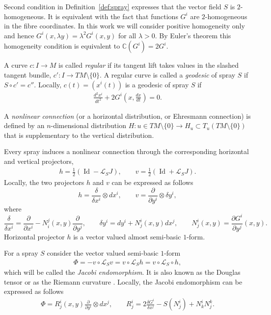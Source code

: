 \documentclass[11pt]{article}
\numberwithin{equation}{section}
\begin{document}
Second condition in Def\/inition~\ref{def:spray} expresses that the
vector f\/ield $S$ is $2$-homogeneous. It is equivalent with the
fact that functions $G^i$ are $2$-homogeneous in the f\/ibre
coordinates. In this work we will consider positive homogeneity
only and hence $G^i(x,\lambda y)=\lambda^2 G^i(x,y)$
for all $\lambda>0$. By Euler's theorem this homogeneity condition is equivalent to
$\mathbb{C}(G^i)=2G^i$.

A curve $c:I \to M$ is called \emph{regular} if its tangent lift takes
values in the slashed tangent bundle, $c': I \to
TM\setminus\{0\}$. A regular curve is called a \emph{geodesic} of
spray $S$ if $S\circ c'=c''$. Locally, $c(t)=(x^i(t))$ is a
geodesic of spray $S$ if
\begin{gather*}
\frac{d^2x^i}{dt^2}+2G^i\left(x,\frac{dx}{dt}\right)=0.
\end{gather*}

\begin{Definition} A \emph{nonlinear connection} (or a horizontal
distribution, or Ehresmann connection) is def\/ined by an
$n$-dimensional distribution $H: u\in TM\setminus\{0\} \to
H_u\subset T_u(TM\setminus\{0\})$ that is supplementary to the
vertical distribution. \end{Definition}

Every spray induces a nonlinear connection through the
corresponding horizontal and vertical projectors, \cite{grifone72}
\begin{gather*}
h=\frac{1}{2}\left(\operatorname{Id}-\mathcal{L}_SJ\right), \qquad
v=\frac{1}{2}\left(\operatorname{Id}+\mathcal{L}_SJ\right).
\end{gather*} Locally, the two projectors $h$ and $v$ can
be expressed as follows
\[
h=\frac{\delta}{\delta x^i} \otimes dx^i, \qquad
v=\frac{\partial}{\partial y^i}\otimes \delta y^i,
\] where
\[
\frac{\delta}{\delta x^i}=\frac{\partial}{\partial
x^i}-N^j_i(x,y)\frac{\partial}{\partial y^j}, \qquad \delta y^i=dy^i+
N^i_j(x,y)dx^j, \qquad N^i_j(x,y)=\frac{\partial G^i}{\partial y^j}(x,y).
\]
Horizontal projector $h$ is a vector valued almost semi-basic
$1$-form.

For a spray $S$ consider the vector valued
semi-basic $1$-form
\begin{gather*}
\Phi=-v\circ \mathcal{L}_Sv = v\circ \mathcal{L}_Sh=v\circ
\mathcal{L}_S \circ h,
\end{gather*} which will be called the
\emph{Jacobi endomorphism}. It is also known as the Douglas tensor
\cite[Def\/inition~3.17]{grifone00} or as the Riemann curvature \cite[Def\/inition~8.1.2]{shen01}.
 Locally, the Jacobi endomorphism can be expressed as follows
\begin{gather*}
\Phi= R^i_j(x,y) \frac{\partial}{\partial y^i}
\otimes dx^j, \qquad R^i_j = 2\frac{\delta G^i}{\delta x^j} -
S(N^i_j) + N^i_kN^k_j. %
\end{gather*}
\end{document}
